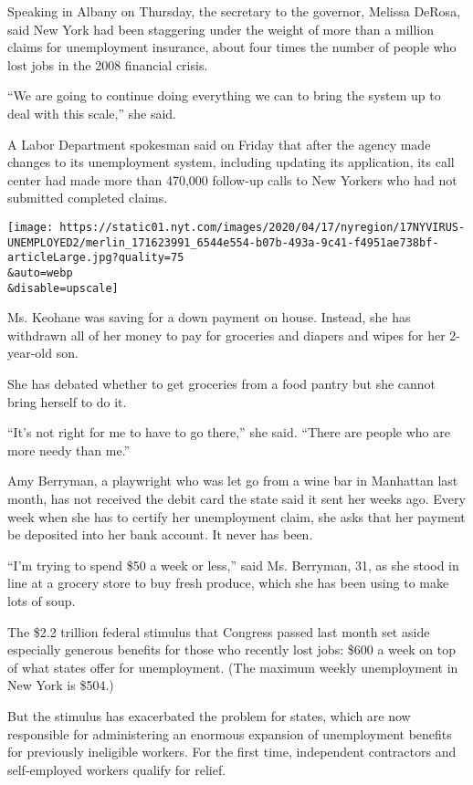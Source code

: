 Speaking in Albany on Thursday, the secretary to the governor, Melissa
DeRosa, said New York had been staggering under the weight of more than
a million claims for unemployment insurance, about four times the number
of people who lost jobs in the 2008 financial crisis.

``We are going to continue doing everything we can to bring the system
up to deal with this scale,'' she said.

A Labor Department spokesman said on Friday that after the agency made
changes to its unemployment system, including updating its application,
its call center had made more than 470,000 follow-up calls to New
Yorkers who had not submitted completed claims.

\texttt{[image: https://static01.nyt.com/images/2020/04/17/nyregion/17NYVIRUS-UNEMPLOYED2/merlin\_171623991\_6544e554-b07b-493a-9c41-f4951ae738bf-articleLarge.jpg?quality=75\\\&auto=webp\\\&disable=upscale]}

Ms. Keohane was saving for a down payment on house. Instead, she has
withdrawn all of her money to pay for groceries and diapers and wipes
for her 2-year-old son.

She has debated whether to get groceries from a food pantry but she
cannot bring herself to do it.

``It's not right for me to have to go there,'' she said. ``There are
people who are more needy than me.''

Amy Berryman, a playwright who was let go from a wine bar in Manhattan
last month, has not received the debit card the state said it sent her
weeks ago. Every week when she has to certify her unemployment claim,
she asks that her payment be deposited into her bank account. It never
has been.

``I'm trying to spend \$50 a week or less,'' said Ms. Berryman, 31, as
she stood in line at a grocery store to buy fresh produce, which she has
been using to make lots of soup.

The \$2.2 trillion federal stimulus that Congress passed last month set
aside especially generous benefits for those who recently lost jobs:
\$600 a week on top of what states offer for unemployment. (The maximum
weekly unemployment in New York is \$504.)

But the stimulus has exacerbated the problem for states, which are now
responsible for administering an enormous expansion of unemployment
benefits for previously ineligible workers. For the first time,
independent contractors and self-employed workers qualify for relief.

